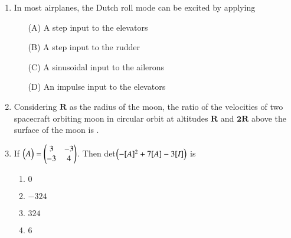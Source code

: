\documentclass[journal]{IEEEtran}
\begin{document}
\begin{enumerate}
\vspace{0.5cm}

\item In most airplanes, the Dutch roll mode can be excited by applying
\begin{multicols}{2}
\begin{itemize}
    \item[(A)] A step input to the elevators
    \item[(B)] A step input to the rudder
    \item[(C)] A sinusoidal input to the ailerons
    \item[(D)] An impulse input to the elevators
\end{itemize}
\end{multicols}

\vspace{0.5cm}

\item Considering $\mathbf{R}$ as the radius of the moon, the ratio of the velocities of two spacecraft orbiting moon in circular orbit at altitudes $\mathbf{R}$ and $\mathbf{2R}$ above the surface of the moon is \underline{\hspace{2cm}}.
\vspace{0.5cm}

\item If $\begin{pmatrix}A\end{pmatrix}=\begin{pmatrix}3 & -3\\-3 & 4\end{pmatrix}$. Then det$\left(-[A]^2+7[A]-3[I]\right)$ is
\begin{multicols}{2}
\begin{enumerate}
    \item $0$
    \item $-324$
    \item $324$
    \item $6$
\end{enumerate}
\end{multicols}
\end{enumerate}
\end{document}
